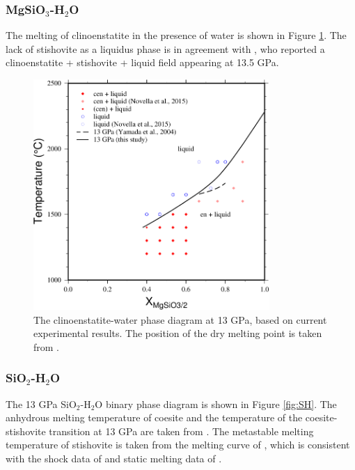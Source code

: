 \documentclass[review]{elsarticle}
\begin{document}
\subsubsection{MgSiO$_3$-H$_2$O}

The melting of clinoenstatite in the presence of water is shown in Figure \ref{fig:eoH}. The lack of stishovite as a liquidus phase is in agreement with \cite{YII2004}, who reported a clinoenstatite + stishovite + liquid field appearing at 13.5 GPa. 
\begin{figure}[ht!]
  \centering
      \includegraphics[width=0.8\textwidth]{figures/en-H2O}
  \caption{The clinoenstatite-water phase diagram at 13 GPa, based on current experimental results. The position of the dry melting point is taken from \cite{PG1990}.}
  \label{fig:eoH}
\end{figure}

\clearpage
\subsubsection{SiO$_2$-H$_2$O}
The 13 GPa SiO$_2$-H$_2$O binary phase diagram is shown in Figure \ref{fig:SH}. The anhydrous melting temperature of coesite and the temperature of the coesite-stishovite transition at 13 GPa are taken from \cite{ZLGHF1993}. The metastable melting temperature of stishovite is taken from the melting curve of \cite{Millotetal2015}, which is consistent with the shock data of \cite{LAM1983} and static melting data of \cite{ZLGHF1993}.
\end{document}
